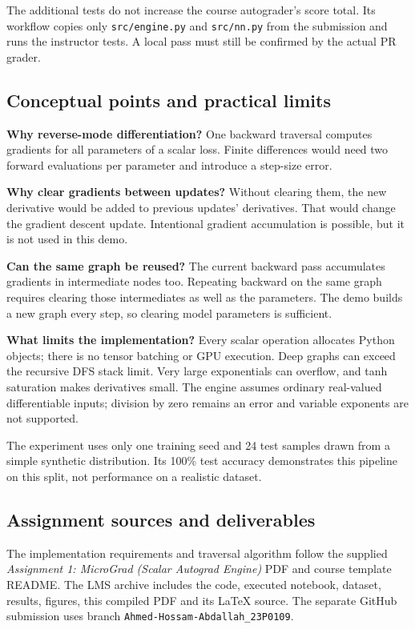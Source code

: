 \documentclass[11pt,a4paper]{article}
\newcommand{\code}[1]{\texttt{#1}}
\begin{document}
The additional tests do not increase the course autograder's score total.
Its workflow copies only \code{src/engine.py} and \code{src/nn.py} from the
submission and runs the instructor tests. A local pass must still be
confirmed by the actual PR grader.

\subsection{Conceptual points and practical limits}
\textbf{Why reverse-mode differentiation?} One backward traversal computes
gradients for all parameters of a scalar loss. Finite differences would
need two forward evaluations per parameter and introduce a step-size error.

\textbf{Why clear gradients between updates?} Without clearing them, the
new derivative would be added to previous updates' derivatives. That would
change the gradient descent update. Intentional gradient accumulation is
possible, but it is not used in this demo.

\textbf{Can the same graph be reused?} The current backward pass accumulates
gradients in intermediate nodes too. Repeating backward on the same graph
requires clearing those intermediates as well as the parameters. The demo
builds a new graph every step, so clearing model parameters is sufficient.

\textbf{What limits the implementation?} Every scalar operation allocates
Python objects; there is no tensor batching or GPU execution. Deep graphs
can exceed the recursive DFS stack limit. Very large exponentials can
overflow, and tanh saturation makes derivatives small. The engine assumes
ordinary real-valued differentiable inputs; division by zero remains an
error and variable exponents are not supported.

The experiment uses only one training seed and 24 test samples drawn from a
simple synthetic distribution. Its 100\% test accuracy demonstrates this
pipeline on this split, not performance on a realistic dataset.

\subsection*{Assignment sources and deliverables}
The implementation requirements and traversal algorithm follow the supplied
\emph{Assignment 1: MicroGrad (Scalar Autograd Engine)} PDF and course
template README. The LMS archive includes the code, executed notebook,
dataset, results, figures, this compiled PDF and its LaTeX source.
The separate GitHub submission uses branch
\code{Ahmed-Hossam-Abdallah\_23P0109}.
\end{document}
